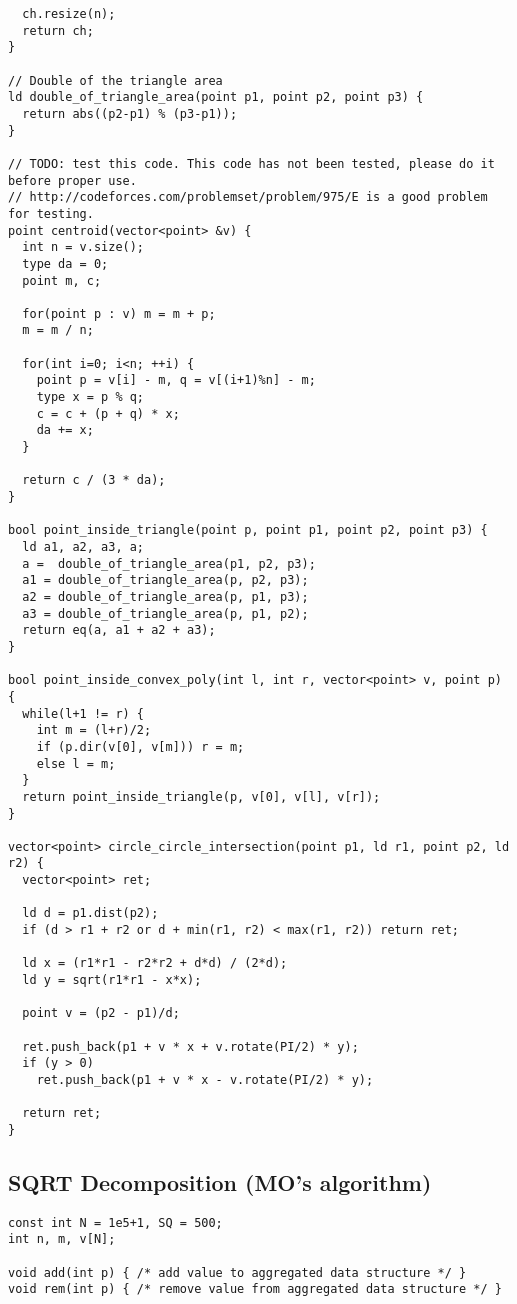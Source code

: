 \documentclass[12pt,a4paper,onesided]{article}
\begin{document}
\begin{multicols}{3}
\begin{lstlisting}
  ch.resize(n);
  return ch;
}

// Double of the triangle area
ld double_of_triangle_area(point p1, point p2, point p3) {
  return abs((p2-p1) % (p3-p1));
}

// TODO: test this code. This code has not been tested, please do it before proper use.
// http://codeforces.com/problemset/problem/975/E is a good problem for testing.
point centroid(vector<point> &v) {
  int n = v.size();
  type da = 0;
  point m, c;

  for(point p : v) m = m + p;
  m = m / n;

  for(int i=0; i<n; ++i) {
    point p = v[i] - m, q = v[(i+1)%n] - m;
    type x = p % q;
    c = c + (p + q) * x;
    da += x;
  }

  return c / (3 * da);
}

bool point_inside_triangle(point p, point p1, point p2, point p3) {
  ld a1, a2, a3, a;
  a =  double_of_triangle_area(p1, p2, p3);
  a1 = double_of_triangle_area(p, p2, p3);
  a2 = double_of_triangle_area(p, p1, p3);
  a3 = double_of_triangle_area(p, p1, p2);
  return eq(a, a1 + a2 + a3);
}

bool point_inside_convex_poly(int l, int r, vector<point> v, point p) {
  while(l+1 != r) {
    int m = (l+r)/2;
    if (p.dir(v[0], v[m])) r = m;
    else l = m;
  }
  return point_inside_triangle(p, v[0], v[l], v[r]);
}

vector<point> circle_circle_intersection(point p1, ld r1, point p2, ld r2) {
  vector<point> ret;

  ld d = p1.dist(p2);
  if (d > r1 + r2 or d + min(r1, r2) < max(r1, r2)) return ret;

  ld x = (r1*r1 - r2*r2 + d*d) / (2*d);
  ld y = sqrt(r1*r1 - x*x);

  point v = (p2 - p1)/d;

  ret.push_back(p1 + v * x + v.rotate(PI/2) * y);
  if (y > 0)
    ret.push_back(p1 + v * x - v.rotate(PI/2) * y);

  return ret;
}
\end{lstlisting}



\subsection{SQRT Decomposition (MO's algorithm)}
\begin{lstlisting}
const int N = 1e5+1, SQ = 500;
int n, m, v[N];

void add(int p) { /* add value to aggregated data structure */ }
void rem(int p) { /* remove value from aggregated data structure */ }


\end{lstlisting}
\end{multicols}
\end{document}
